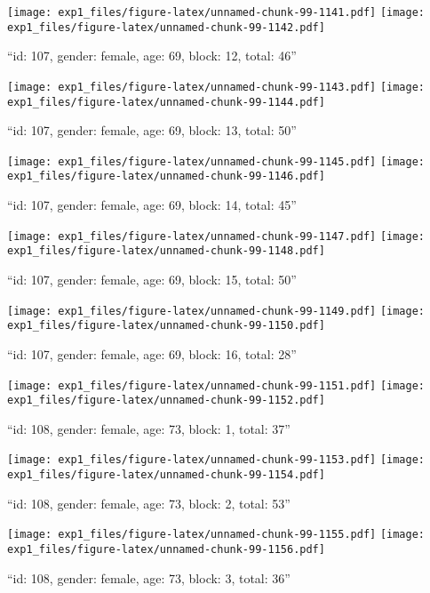 \documentclass[,]{article}
\begin{document}
\texttt{[image: exp1\_files/figure-latex/unnamed-chunk-99-1141.pdf]}
\texttt{[image: exp1\_files/figure-latex/unnamed-chunk-99-1142.pdf]}

\newpage
[1] 

``id: 107, gender: female, age: 69, block: 12, total: 46''

\texttt{[image: exp1\_files/figure-latex/unnamed-chunk-99-1143.pdf]}
\texttt{[image: exp1\_files/figure-latex/unnamed-chunk-99-1144.pdf]}

\newpage
[1] 

``id: 107, gender: female, age: 69, block: 13, total: 50''

\texttt{[image: exp1\_files/figure-latex/unnamed-chunk-99-1145.pdf]}
\texttt{[image: exp1\_files/figure-latex/unnamed-chunk-99-1146.pdf]}

\newpage
[1] 

``id: 107, gender: female, age: 69, block: 14, total: 45''

\texttt{[image: exp1\_files/figure-latex/unnamed-chunk-99-1147.pdf]}
\texttt{[image: exp1\_files/figure-latex/unnamed-chunk-99-1148.pdf]}

\newpage
[1] 

``id: 107, gender: female, age: 69, block: 15, total: 50''

\texttt{[image: exp1\_files/figure-latex/unnamed-chunk-99-1149.pdf]}
\texttt{[image: exp1\_files/figure-latex/unnamed-chunk-99-1150.pdf]}

\newpage
[1] 

``id: 107, gender: female, age: 69, block: 16, total: 28''

\texttt{[image: exp1\_files/figure-latex/unnamed-chunk-99-1151.pdf]}
\texttt{[image: exp1\_files/figure-latex/unnamed-chunk-99-1152.pdf]}

\newpage
[1] 

``id: 108, gender: female, age: 73, block: 1, total: 37''

\texttt{[image: exp1\_files/figure-latex/unnamed-chunk-99-1153.pdf]}
\texttt{[image: exp1\_files/figure-latex/unnamed-chunk-99-1154.pdf]}

\newpage
[1] 

``id: 108, gender: female, age: 73, block: 2, total: 53''

\texttt{[image: exp1\_files/figure-latex/unnamed-chunk-99-1155.pdf]}
\texttt{[image: exp1\_files/figure-latex/unnamed-chunk-99-1156.pdf]}

\newpage
[1] 

``id: 108, gender: female, age: 73, block: 3, total: 36''
\end{document}
